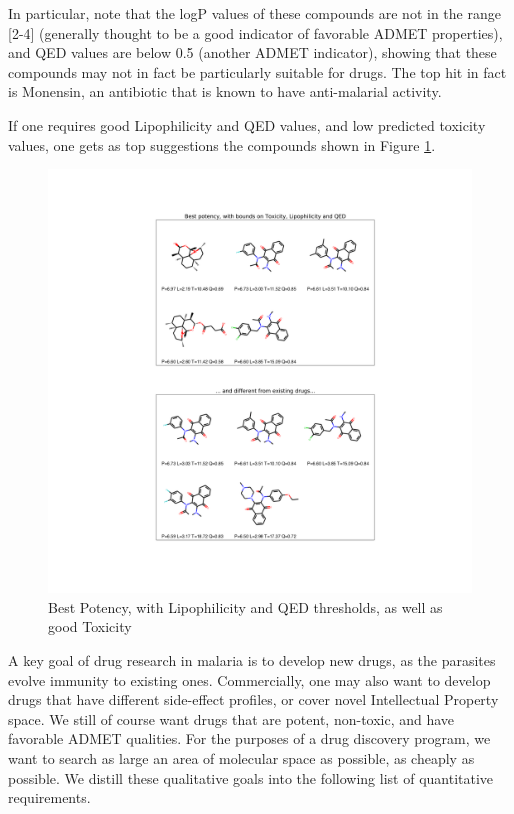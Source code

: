 \documentclass{article}
\begin{document}
In particular, note that the logP values of these compounds are not in the range [2-4] (generally thought to be a good indicator of favorable ADMET properties), and QED values are below 0.5 (another ADMET indicator), showing that these compounds may not in fact be particularly suitable for drugs.  The top hit in fact is Monensin, an antibiotic that is known to have anti-malarial activity\cite{Ludwig2019}.

If one requires good Lipophilicity and QED values, and low predicted toxicity values, one gets as top suggestions the compounds shown in Figure \ref{fig:best_q}.


\begin{figure}[h!]
\centering
\includegraphics[width=\textwidth]{fig7.png}
\caption{Best Potency, with Lipophilicity and QED thresholds, as well as good Toxicity}
\label{fig:best_q}
\end{figure}


A key goal of drug research in malaria is to develop new drugs, as the parasites evolve immunity to existing ones.  Commercially, one may also want to develop drugs that have different side-effect profiles, or cover novel Intellectual Property space.  We still of course want drugs that are potent, non-toxic, and have favorable ADMET qualities.  For the purposes of a drug discovery program, we want to search as large an area of molecular space as possible, as cheaply as possible.  We distill these qualitative goals into the following list of quantitative requirements. 
\end{document}
